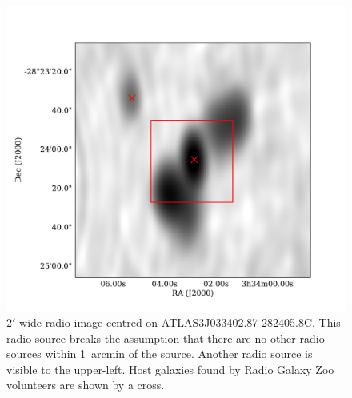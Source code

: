 \documentclass[fleqn,usenatbib,usedcolumn]{mnras}
\begin{document}
     \begin{figure}
      \centering
      \includegraphics[width=\linewidth]{images/CI0077C1_fig.pdf}
      \caption{$2'$-wide radio image centred on ATLAS3\textunderscore{}J033402.87-282405.8C.
        This radio source breaks the assumption that there are no other radio
        sources within 1~arcmin of the source. Another radio source is visible
        to the upper-left. Host galaxies found by Radio Galaxy Zoo volunteers
        are shown by a cross.}
      \label{fig:broken-isolation}
    \end{figure}
\end{document}
